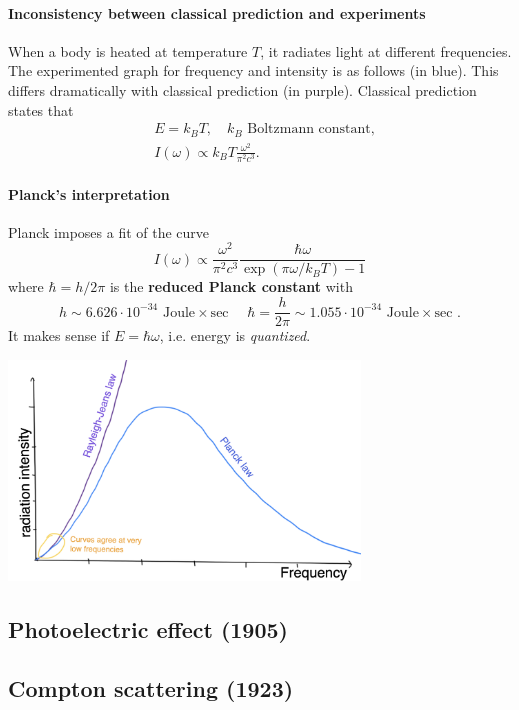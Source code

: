 \documentclass[a4paper]{article}
\begin{document}
\paragraph{Inconsistency between classical prediction and experiments}
When a body is heated at temperature $T$, it radiates light at different frequencies. The experimented graph for frequency and intensity is as follows (in blue). This differs dramatically with classical prediction (in purple). Classical prediction states that 
\begin{align*}
    &E = k_B T, \quad k_B \text{ Boltzmann constant},\\ 
    &I(\omega) \propto k_B T \frac{\omega^2}{\pi^2 c^3}. 
\end{align*}
\paragraph{Planck's interpretation}
Planck imposes a fit of the curve 
\[
    I(\omega) \propto \frac{\omega^2}{\pi^2c^3} \frac{\hbar \omega}{\exp(\pi \omega/k_B T)-1}
\]
where $ \hbar = h/2\pi $ is the \textbf{reduced Planck constant} with 
\[
    h \sim 6.626 \cdot 10^{-34} \text { Joule} \times \text {sec } \quad \hbar=\frac{h}{2 \pi} \sim 1.055 \cdot 10^{-34} \text { Joule} \times \text {sec }. 
\]
It makes sense if $ E = \hbar \omega $, i.e. energy is \textit{quantized}.
\begin{center}
    \includegraphics[width=0.7\textwidth]{qm1.png}
\end{center}

\subsection{Photoelectric effect (1905)}
\subsection{Compton scattering (1923)}
\end{document}
